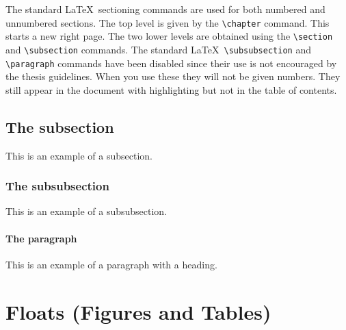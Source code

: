 The standard \LaTeX\ sectioning commands are used for both numbered
and unnumbered sections. The top level is given by the \verb+\chapter+
command. This starts a new right page. The two lower levels are
obtained using the \verb+\section+ and \verb+\subsection+ commands.
The standard \LaTeX\ \verb+\subsubsection+ and \verb+\paragraph+
commands have been disabled since their use is not encouraged by the
thesis guidelines. When you use these they will not be given numbers.  
They still appear in the document with highlighting but not in the 
table of contents.

\subsection{The subsection}

This is an example of a subsection.

\subsubsection{The subsubsection}

This is an example of a subsubsection.

\paragraph{The paragraph}

This is an example of a paragraph with a heading.

\section{Floats (Figures and Tables)}
\label{sec:floats}

